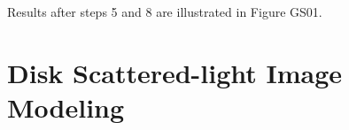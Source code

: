 \documentclass{aa}
\begin{document}
Results after steps 5 and 8 are illustrated in Figure GS01.





\section{Disk Scattered-light Image Modeling}
\label{sec:disk_model}
\end{document}
